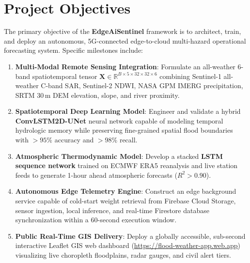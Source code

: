 \documentclass[12pt,a4paper,oneside]{report}
\begin{document}
\section{Project Objectives}
The primary objective of the \textbf{EdgeAiSentinel} framework is to architect, train, and deploy an autonomous, 5G-connected edge-to-cloud multi-hazard operational forecasting system. Specific milestones include:
\begin{enumerate}
    \item \textbf{Multi-Modal Remote Sensing Integration}: Formulate an all-weather 6-band spatiotemporal tensor $\mathbf{X} \in \mathbb{R}^{B \times 5 \times 32 \times 32 \times 6}$ combining Sentinel-1 all-weather C-band SAR, Sentinel-2 NDWI, NASA GPM IMERG precipitation, SRTM 30\,m DEM elevation, slope, and river proximity.
    \item \textbf{Spatiotemporal Deep Learning Model}: Engineer and validate a hybrid \textbf{ConvLSTM2D-UNet} neural network capable of modeling temporal hydrologic memory while preserving fine-grained spatial flood boundaries with $> 95\%$ accuracy and $> 98\%$ recall.
    \item \textbf{Atmospheric Thermodynamic Model}: Develop a stacked \textbf{LSTM sequence network} trained on ECMWF ERA5 reanalysis and live station feeds to generate 1-hour ahead atmospheric forecasts ($R^2 > 0.90$).
    \item \textbf{Autonomous Edge Telemetry Engine}: Construct an edge background service capable of cold-start weight retrieval from Firebase Cloud Storage, sensor ingestion, local inference, and real-time Firestore database synchronization within a 60-second execution window.
    \item \textbf{Public Real-Time GIS Delivery}: Deploy a globally accessible, sub-second interactive Leaflet GIS web dashboard (\url{https://flood-weather-app.web.app}) visualizing live choropleth floodplains, radar gauges, and civil alert tiers.
\end{enumerate}
\end{document}
